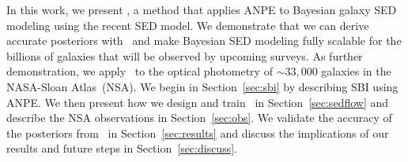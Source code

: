 
In this work, we present \sedflow, a method that applies ANPE to Bayesian
galaxy SED modeling using the recent \cite{hahn2022} SED model. 
We demonstrate that we can derive accurate posteriors with \sedflow~and make
Bayesian SED modeling fully scalable for the billions of galaxies that will be
observed by upcoming surveys.
As further demonstration, we apply \sedflow~to the optical photometry of
${\sim}33,000$ galaxies in the NASA-Sloan Atlas~(NSA). 
We begin in Section~\ref{sec:sbi} by describing SBI using ANPE.
We then present how we design and train \sedflow~in Section~\ref{sec:sedflow}
and describe the NSA observations in Section~\ref{sec:obs}. 
We validate the accuracy of the posteriors from \sedflow~in
Section~\ref{sec:results} and discuss the implications of our results and
future steps in Section~\ref{sec:discuss}. 
